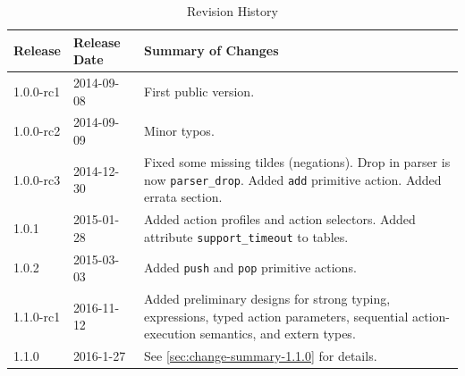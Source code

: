 \documentclass[12pt]{article}
\begin{document}
\begin{table}[H]
\begin{center}
\begin{tabular}{| l | l | p{} |} \hline
\textbf{Release} &
\textbf{Release Date} &
\textbf{Summary of Changes} \\  \hline
1.0.0-rc1 & 2014-09-08 & First public version. \\  \hline
1.0.0-rc2 & 2014-09-09 & Minor typos. \\  \hline
1.0.0-rc3 & 2014-12-30 & Fixed some missing tildes (negations). Drop in parser is now \texttt{parser_drop}. Added \texttt{add} primitive action. Added errata section. \\  \hline
1.0.1 & 2015-01-28 & Added action profiles and action selectors. Added attribute \texttt{support_timeout} to tables. \\  \hline
1.0.2 & 2015-03-03 & Added \texttt{push} and \texttt{pop} primitive actions. \\  \hline
1.1.0-rc1 & 2016-11-12 & Added preliminary designs for strong typing, expressions, typed action parameters, sequential action-execution semantics, and extern types. \\  \hline 
1.1.0 & 2016-1-27 & See \ref{sec:change-summary-1.1.0} for details. \\ \hline
\end{tabular}
\end{center}
\caption{Revision History}
\label{tab:revhistory}
\end{table}

\end{document}
